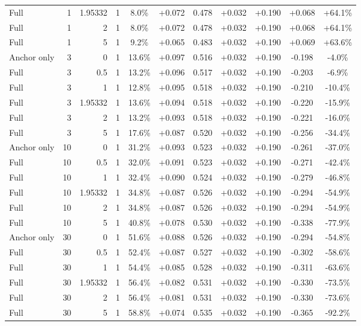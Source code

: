 \begin{table}[htbp]
\begin{tabular}{lrrrccccccc}
Full & 1 & 1.95332 & 1 & 8.0\% & +0.072 & 0.478 & +0.032 & +0.190 & +0.068 & +64.1\% \\
Full & 1 & 2 & 1 & 8.0\% & +0.072 & 0.478 & +0.032 & +0.190 & +0.068 & +64.1\% \\
Full & 1 & 5 & 1 & 9.2\% & +0.065 & 0.483 & +0.032 & +0.190 & +0.069 & +63.6\% \\
Anchor only & 3 & 0 & 1 & 13.6\% & +0.097 & 0.516 & +0.032 & +0.190 & -0.198 & -4.0\% \\
Full & 3 & 0.5 & 1 & 13.2\% & +0.096 & 0.517 & +0.032 & +0.190 & -0.203 & -6.9\% \\
Full & 3 & 1 & 1 & 12.8\% & +0.095 & 0.518 & +0.032 & +0.190 & -0.210 & -10.4\% \\
Full & 3 & 1.95332 & 1 & 13.6\% & +0.094 & 0.518 & +0.032 & +0.190 & -0.220 & -15.9\% \\
Full & 3 & 2 & 1 & 13.2\% & +0.093 & 0.518 & +0.032 & +0.190 & -0.221 & -16.0\% \\
Full & 3 & 5 & 1 & 17.6\% & +0.087 & 0.520 & +0.032 & +0.190 & -0.256 & -34.4\% \\
Anchor only & 10 & 0 & 1 & 31.2\% & +0.093 & 0.523 & +0.032 & +0.190 & -0.261 & -37.0\% \\
Full & 10 & 0.5 & 1 & 32.0\% & +0.091 & 0.523 & +0.032 & +0.190 & -0.271 & -42.4\% \\
Full & 10 & 1 & 1 & 32.4\% & +0.090 & 0.524 & +0.032 & +0.190 & -0.279 & -46.8\% \\
Full & 10 & 1.95332 & 1 & 34.8\% & +0.087 & 0.526 & +0.032 & +0.190 & -0.294 & -54.9\% \\
Full & 10 & 2 & 1 & 34.8\% & +0.087 & 0.526 & +0.032 & +0.190 & -0.294 & -54.9\% \\
Full & 10 & 5 & 1 & 40.8\% & +0.078 & 0.530 & +0.032 & +0.190 & -0.338 & -77.9\% \\
Anchor only & 30 & 0 & 1 & 51.6\% & +0.088 & 0.526 & +0.032 & +0.190 & -0.294 & -54.8\% \\
Full & 30 & 0.5 & 1 & 52.4\% & +0.087 & 0.527 & +0.032 & +0.190 & -0.302 & -58.6\% \\
Full & 30 & 1 & 1 & 54.4\% & +0.085 & 0.528 & +0.032 & +0.190 & -0.311 & -63.6\% \\
Full & 30 & 1.95332 & 1 & 56.4\% & +0.082 & 0.531 & +0.032 & +0.190 & -0.330 & -73.5\% \\
Full & 30 & 2 & 1 & 56.4\% & +0.081 & 0.531 & +0.032 & +0.190 & -0.330 & -73.6\% \\
Full & 30 & 5 & 1 & 58.8\% & +0.074 & 0.535 & +0.032 & +0.190 & -0.365 & -92.2\% \\

\end{tabular}
\end{table}
